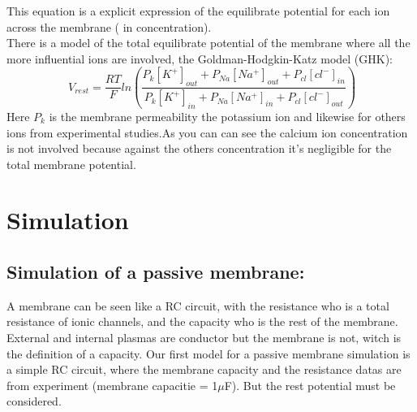 \documentclass[a4paper,10pt]{report}
\begin{document}
 This equation is a explicit expression of the equilibrate potential for each ion across the membrane ( in concentration).\\
 There is a model of the total equilibrate potential of the membrane where all the more influential ions are involved, the Goldman-Hodgkin-Katz model (GHK):
 $$
 \ V_{rest}= \frac{RT}{F}ln(\frac{P_{k}[K^{+}]_{out}+P_{Na}[Na^{+}]_{out}+P_{cl}[cl^{-}]_{in}}{P_{k}[K^{+}]_{in}+P_{Na}[Na^{+}]_{in}+P_{cl}[cl^{-}]_{out}})
 $$
 Here $P_{k}$ is the membrane permeability the potassium ion and likewise for others ions from experimental studies.As you can can see the calcium ion concentration is not involved because against the others concentration it's negligible for the total membrane potential.  
 
 
\chapter{Simulation }
  
 \section{Simulation of a passive membrane:}
 
 

A membrane can be seen like a RC circuit, with the resistance who is a total resistance of ionic channels, and the capacity who is the rest of the membrane. External and internal plasmas are conductor but the membrane is not, witch is the definition of a capacity. Our first model for a passive membrane simulation is a simple RC circuit, where the membrane capacity and the resistance datas are from experiment (membrane capacitie = 1$\mu$F). But the rest potential must be considered. 
\end{document}
